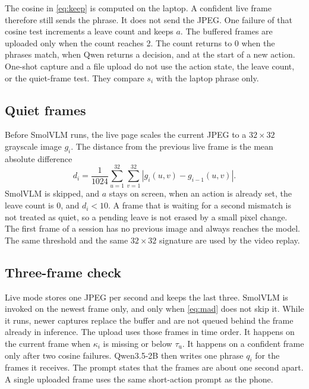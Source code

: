 The cosine in \eqref{eq:keep} is computed on the laptop. A confident live
frame therefore still sends the phrase. It does not send the JPEG. One
failure of that cosine test increments a leave count and keeps $a$. The
buffered frames are uploaded only when the count reaches 2. The count
returns to 0 when the phrases match, when Qwen returns a decision, and at
the start of a new action. One-shot capture and a file upload do not use
the action state, the leave count, or the quiet-frame test. They compare
$s_i$ with the laptop phrase only.

\subsection{Quiet frames}

Before SmolVLM runs, the live page scales the current JPEG to a
\(32\times 32\) grayscale image \(g_i\). The distance from the previous
live frame is the mean absolute difference
\begin{equation}
\label{eq:mad}
d_i
=
\frac{1}{1024}
\sum_{u=1}^{32}
\sum_{v=1}^{32}
\left|g_i(u,v)-g_{i-1}(u,v)\right|.
\end{equation}
SmolVLM is skipped, and \(a\) stays on screen, when an action is already
set, the leave count is 0, and \(d_i<10\). A frame that is waiting for a
second mismatch is not treated as quiet, so a pending leave is not erased
by a small pixel change. The first frame of a session has no previous
image and always reaches the model. The same threshold and the same
\(32\times 32\) signature are used by the video replay.



\subsection{Three-frame check}

Live mode stores one JPEG per second and keeps the last three. SmolVLM is
invoked on the newest frame only, and only when \eqref{eq:mad} does not
skip it. While it runs, newer captures replace the buffer and are not
queued behind the frame already in inference. The upload uses those frames
in time order. It happens on the current frame when $\kappa_i$ is missing
or below $\tau_{\mathrm{u}}$. It happens on a confident frame only after
two cosine failures. Qwen3.5-2B then writes one phrase $q_i$ for the frames
it receives. The prompt states that the frames are about one second apart.
A single uploaded frame uses the same short-action prompt as the phone.

